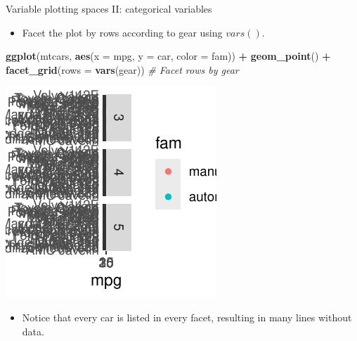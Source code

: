 \documentclass[
  ignorenonframetext,
]{beamer}
\newenvironment{Shaded}{\begin{snugshade}}{\end{snugshade}}
\newcommand{\AttributeTok}[1]{\textcolor[rgb]{0.13,0.29,0.53}{#1}}
\newcommand{\CommentTok}[1]{\textcolor[rgb]{0.56,0.35,0.01}{\textit{#1}}}
\newcommand{\FunctionTok}[1]{\textcolor[rgb]{0.13,0.29,0.53}{\textbf{#1}}}
\newcommand{\NormalTok}[1]{#1}
\newcommand{\SpecialCharTok}[1]{\textcolor[rgb]{0.81,0.36,0.00}{\textbf{#1}}}
\providecommand{\tightlist}{%
  \setlength{\itemsep}{0pt}\setlength{\parskip}{0pt}}
\begin{document}
\begin{frame}[fragile]{Variable plotting spaces II: categorical
variables}
\label{variable-plotting-spaces-ii-categorical-variables-2}
\begin{itemize}
\tightlist
\item
  Facet the plot by rows according to gear using \(vars()\).
\end{itemize}


\begin{Shaded}
\begin{Highlighting}[]
\FunctionTok{ggplot}\NormalTok{(mtcars, }\FunctionTok{aes}\NormalTok{(}\AttributeTok{x =}\NormalTok{ mpg, }\AttributeTok{y =}\NormalTok{ car, }\AttributeTok{color =}\NormalTok{ fam)) }\SpecialCharTok{+} \FunctionTok{geom\_point}\NormalTok{() }\SpecialCharTok{+}
    \FunctionTok{facet\_grid}\NormalTok{(}\AttributeTok{rows =} \FunctionTok{vars}\NormalTok{(gear))  }\CommentTok{\# Facet rows by gear}
\end{Highlighting}
\end{Shaded}

\begin{center}\includegraphics[width=0.5\linewidth]{Figs/unnamed-chunk-91-1} \end{center}

\begin{itemize}
\tightlist
\item
  Notice that every car is listed in every facet, resulting in many
  lines without data.
\end{itemize}
\end{frame}
\end{document}
